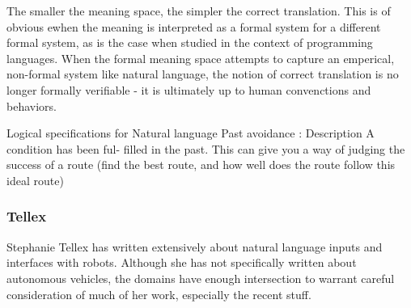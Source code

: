 \documentclass{article}
\begin{document}
The smaller the meaning space, the simpler the correct translation. This is of
obvious ewhen the meaning is interpreted as a formal system for a different
formal system, as is the case when studied in the context of programming
languages. When the formal meaning space attempts to capture an emperical,
non-formal system like natural language, the notion of correct translation is no
longer formally verifiable - it is ultimately up to human convenctions and
behaviors.

Logical specifications for Natural language
Past avoidance : Description
A condition has been ful-
filled in the past. This can give you a way of judging the success of a route (find the best route, and how well does the route follow this ideal route)





\subsubsection{Tellex}

Stephanie Tellex has written extensively about natural language inputs and
interfaces with robots. Although she has not specifically written about
autonomous vehicles, the domains have enough intersection to warrant careful
consideration of much of her work, especially the recent stuff.
\end{document}
